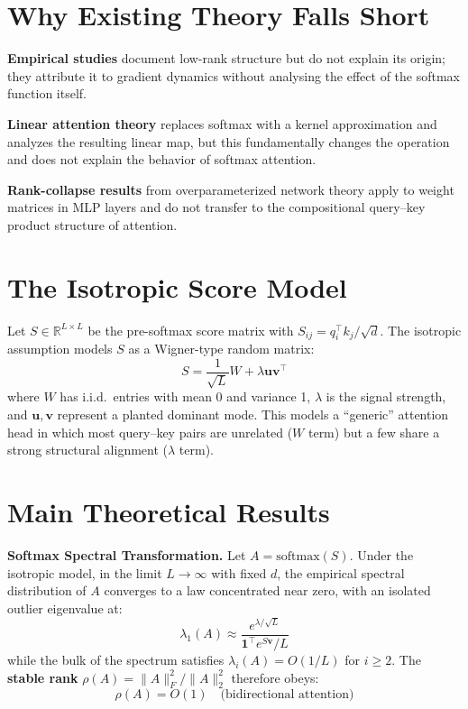 \documentclass[10pt,twocolumn]{article}
\begin{document}
\section{Why Existing Theory Falls Short}

\textbf{Empirical studies} document low-rank structure but do not
explain its origin; they attribute it to gradient dynamics without
analysing the effect of the softmax function itself.

\textbf{Linear attention theory} replaces softmax with a kernel
approximation and analyzes the resulting linear map, but this
fundamentally changes the operation and does not explain the behavior
of softmax attention.

\textbf{Rank-collapse results} from overparameterized network theory
apply to weight matrices in MLP layers and do not transfer to the
compositional query--key product structure of attention.

\section{The Isotropic Score Model}

Let $S \in \mathbb{R}^{L \times L}$ be the pre-softmax score matrix
with $S_{ij} = q_i^\top k_j / \sqrt{d}$. The isotropic assumption
models $S$ as a Wigner-type random matrix:
\[
  S = \frac{1}{\sqrt{L}} W + \lambda \mathbf{u}\mathbf{v}^\top
\]
where $W$ has i.i.d.\ entries with mean 0 and variance 1, $\lambda$ is
the signal strength, and $\mathbf{u},\mathbf{v}$ represent a planted
dominant mode. This models a ``generic'' attention head in which most
query--key pairs are unrelated ($W$ term) but a few share a strong
structural alignment ($\lambda$ term).

\section{Main Theoretical Results}

\textbf{Softmax Spectral Transformation.} Let
$A = \mathrm{softmax}(S)$. Under the isotropic model, in the limit
$L \to \infty$ with fixed $d$, the empirical spectral distribution of
$A$ converges to a law concentrated near zero, with an isolated outlier
eigenvalue at:
\[
  \lambda_1(A) \approx \frac{e^{\lambda/\sqrt{L}}}
    {\mathbf{1}^\top e^{S\mathbf{v}} / L}
\]
while the bulk of the spectrum satisfies $\lambda_i(A) = O(1/L)$ for
$i \geq 2$. The \textbf{stable rank} $\rho(A) = \|A\|_F^2 / \|A\|_2^2$
therefore obeys:
\[
  \rho(A) = O(1) \quad \text{(bidirectional attention)}
\]
\end{document}

